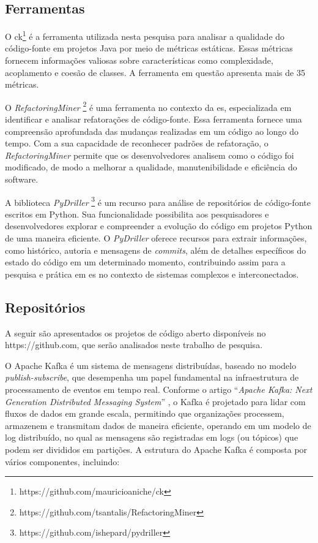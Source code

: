 \subsection{Ferramentas}\label{sec:ferramentas}
O \gls{ck}\footnote{https://github.com/mauricioaniche/ck} \cite{aniche-ck} é a ferramenta utilizada nesta pesquisa para analisar a qualidade do código-fonte em projetos Java \cite{JavaProgrammingLanguage} por meio de métricas estáticas. Essas métricas fornecem informações valiosas sobre características como complexidade, acoplamento e coesão de classes. A ferramenta em questão apresenta mais de 35 métricas.

O \textit{RefactoringMiner} \footnote{https://github.com/tsantalis/RefactoringMiner} \cite{Tsantalis:ICSE:2018:RefactoringMiner} é uma ferramenta no contexto da \gls{es}, especializada em identificar e analisar refatorações de código-fonte. Essa ferramenta fornece uma compreensão aprofundada das mudanças realizadas em um código ao longo do tempo. Com a sua capacidade de reconhecer padrões de refatoração, o \textit{RefactoringMiner} permite que os desenvolvedores analisem como o código foi modificado, de modo a melhorar a qualidade, manutenibilidade e eficiência do software.

A biblioteca \textit{PyDriller} \footnote{https://github.com/ishepard/pydriller}\cite{PyDrillerSpadini2018} é um recurso para análise de repositórios de código-fonte escritos em Python. Sua funcionalidade possibilita aos pesquisadores e desenvolvedores explorar e compreender a evolução do código em projetos Python de uma maneira eficiente. O \textit{PyDriller} oferece recursos para extrair informações, como histórico, autoria e mensagens de \textit{commits}, além de detalhes específicos do estado do código em um determinado momento, contribuindo assim para a pesquisa e prática em \gls{es} no contexto de sistemas complexos e interconectados.

\subsection{Repositórios}\label{sec:repositorios}
A seguir são apresentados os projetos de código aberto disponíveis no https://github.com, que serão analisados neste trabalho de pesquisa.

O Apache Kafka \cite{KafkaGitHub} é um sistema de mensagens distribuídas, baseado no modelo \textit{publish-subscribe}, que desempenha um papel fundamental na infraestrutura de processamento de eventos em tempo real. Conforme o artigo ``\textit{Apache Kafka: Next Generation Distributed Messaging System}'' \cite{ApacheKafkaNextGenerationDistributedMessagingSystem:2010}, o Kafka é projetado para lidar com fluxos de dados em grande escala, permitindo que organizações processem, armazenem e transmitam dados de maneira eficiente, operando em um modelo de log distribuído, no qual as mensagens são registradas em logs (ou tópicos) que podem ser divididos em partições. 
A estrutura do Apache Kafka é composta por vários componentes, incluindo:

